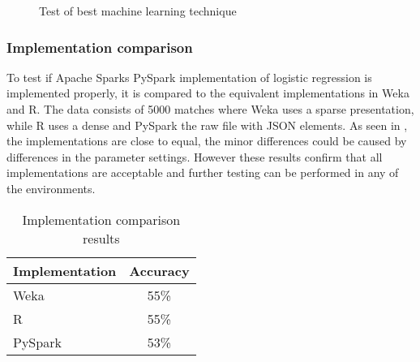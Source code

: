 \begin{figure}[!htb]
  \caption{Test of best machine learning technique}\label{fig:besttech}
\end{figure}



\subsubsection{Implementation comparison}
To test if Apache Sparks PySpark implementation of logistic regression is implemented properly, it is compared to the equivalent implementations in Weka and R. The data consists of 5000 matches where Weka uses a sparse presentation, while R uses a dense and PySpark the raw file with JSON elements. As seen in , the implementations are close to equal, the minor differences could be caused by differences in the parameter settings. However these results confirm that all implementations are acceptable and further testing can be performed in any of the environments.

\begin{table}[!htb]
  \centering
  \begin{tabular}{|l|c|}
    \hline
    Implementation  & Accuracy  \\
    \hline
    Weka & 55\%  \\
    R & 55\%\\
    PySpark & 53\%\\ 
    \hline
  \end{tabular}
  \caption{Implementation comparison results}
  \label{tab:impl_results}
\end{table}

